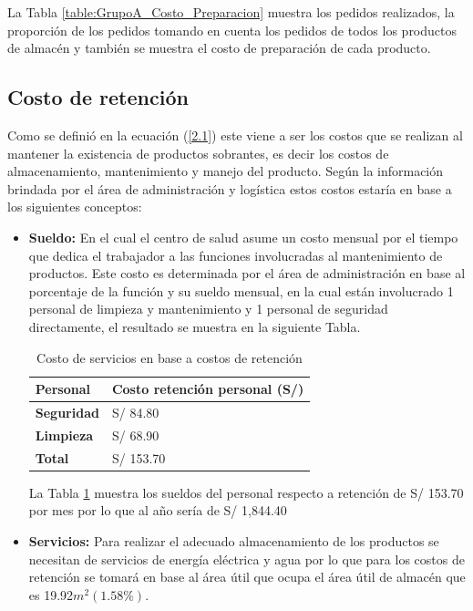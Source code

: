 La Tabla \ref{table:GrupoA_Costo_Preparacion} muestra los pedidos realizados, la proporción de los pedidos tomando en cuenta los pedidos de todos los productos de almacén y también se muestra el costo de preparación de cada producto.

\subsection{Costo de retención}
Como se definió en la ecuación (\ref{2.1}) este viene a ser los costos que se realizan al mantener la existencia de productos sobrantes, es decir los costos de almacenamiento, mantenimiento y manejo del producto. Según la información brindada por el área de administración y logística estos costos estaría en base a los siguientes conceptos:

\begin{itemize}
\item \textbf{Sueldo:} En el cual el centro de salud asume un costo mensual por el tiempo que dedica el trabajador a las funciones involucradas al mantenimiento de productos. Este costo es determinada por el área de administración en base al porcentaje de la función y su sueldo mensual, en la cual están involucrado 1 personal de limpieza y mantenimiento y 1 personal de seguridad directamente, el resultado se muestra en la siguiente Tabla.

\begin{table}[H]
    \caption{Costo de servicios en base a costos de retención}
    \begin{tabular}{p{5cm} p{8cm}} %
        \hline
        \textbf{Personal} & \textbf{Costo retención personal (S/)} \\
        \hline
        \textbf{Seguridad} & S/ 84.80 \\
        \textbf{Limpieza} & S/ 68.90 \\
        \hline
        \textbf{Total} & S/ 153.70
    \end{tabular}
    \label{table:Personal_costo_retencion}
\end{table}

La Tabla \ref{table:Personal_costo_retencion} muestra los sueldos del personal respecto a retención de S/ 153.70 por mes por lo que al año sería de S/ 1,844.40

\item \textbf{Servicios:} Para realizar el adecuado almacenamiento de los productos se necesitan de servicios de energía eléctrica y agua por lo que para los costos de retención se tomará en base al área útil que ocupa el área útil de almacén que es 19.92$m^2(1.58\%)$.


\end{itemize}
